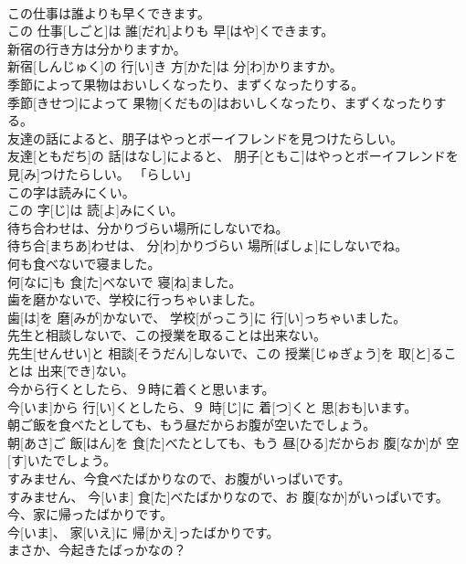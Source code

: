\documentclass[8pt]{extreport}
\begin{document}
\begin{CJK}{UTF8}{min}
\\	この仕事は誰よりも早くできます。	
\\	この 仕事[しごと]は 誰[だれ]よりも 早[はや]くできます。	
\\	新宿の行き方は分かりますか。	
\\	新宿[しんじゅく]の 行[い]き 方[かた]は 分[わ]かりますか。	
\\	季節によって果物はおいしくなったり、まずくなったりする。	
\\	季節[きせつ]によって 果物[くだもの]はおいしくなったり、まずくなったりする。	
\\	友達の話によると、朋子はやっとボーイフレンドを見つけたらしい。	
\\	友達[ともだち]の 話[はなし]によると、 朋子[ともこ]はやっとボーイフレンドを 見[み]つけたらしい。	「らしい」
\\	この字は読みにくい。	
\\	この 字[じ]は 読[よ]みにくい。	
\\	待ち合わせは、分かりづらい場所にしないでね。	
\\	待ち合[まちあ]わせは、 分[わ]かりづらい 場所[ばしょ]にしないでね。	
\\	何も食べないで寝ました。	
\\	何[なに]も 食[た]べないで 寝[ね]ました。	
\\	歯を磨かないで、学校に行っちゃいました。	
\\	歯[は]を 磨[みが]かないで、 学校[がっこう]に 行[い]っちゃいました。	
\\	先生と相談しないで、この授業を取ることは出来ない。	
\\	先生[せんせい]と 相談[そうだん]しないで、この 授業[じゅぎょう]を 取[と]ることは 出来[でき]ない。	
\\	今から行くとしたら、９時に着くと思います。	
\\	今[いま]から 行[い]くとしたら、９ 時[じ]に 着[つ]くと 思[おも]います。	
\\	朝ご飯を食べたとしても、もう昼だからお腹が空いたでしょう。	
\\	朝[あさ]ご 飯[はん]を 食[た]べたとしても、もう 昼[ひる]だからお 腹[なか]が 空[す]いたでしょう。	
\\	すみません、今食べたばかりなので、お腹がいっぱいです。	
\\	すみません、 今[いま] 食[た]べたばかりなので、お 腹[なか]がいっぱいです。	
\\	今、家に帰ったばかりです。	
\\	今[いま]、 家[いえ]に 帰[かえ]ったばかりです。	
\\	まさか、今起きたばっかなの？	

\end{CJK}
\end{document}
